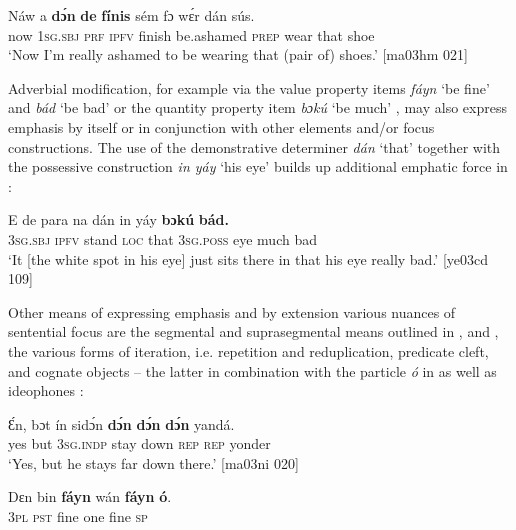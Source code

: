 \ea%
    \label{ex:key:743}
    \gll Náw    a    \textbf{dɔ́n}  \textbf{de}  \textbf{fínis}  sém  
fɔ  wɛ́r    dán    sús.\\
now    \textsc{1sg.sbj}  \textsc{prf}  \textsc{ipfv}  finish  be.ashamed
\textsc{prep}  wear  that    shoe\\

\glt ‘Now I’m really ashamed to be wearing that (pair of) shoes.’ [ma03hm 021]
\z

Adverbial modification, for example via the value property items \textit{fáyn} ‘be fine’ and \textit{bád} ‘be bad’ or the quantity property item \textit{bɔkú} ‘be much’ , may also express emphasis by itself or in conjunction with other elements and/or focus constructions. The use of the demonstrative determiner \textit{dán} ‘that’ together with the possessive construction \textit{in yáy} ‘his eye’ builds up additional emphatic force in :


\ea%
    \label{ex:key:744}
    \gll E    de  para    na  dán  in    yáy  \textbf{bɔkú}  \textbf{bád.}\\
\textsc{3sg.sbj}  \textsc{ipfv}  stand  \textsc{loc}  that  \textsc{3sg.poss}  eye  much  bad\\

\glt ‘It [the white spot in his eye] just sits there in that his eye really bad.’ [ye03cd 109]
\z

Other means of expressing emphasis and by extension various nuances of sentential focus are the segmental and suprasegmental means outlined in ,  and , the various forms of iteration, i.e. repetition  and reduplication, predicate cleft, and cognate objects – the latter in combination with the particle \textit{ó} in  as well as ideophones :


\ea%
    \label{ex:key:745}
    \gll Ɛ́n,  bɔt  ín    sidɔ́n  \textbf{dɔ́n}    \textbf{dɔ́n}     \textbf{dɔ́n}    yandá.\\
yes  but  \textsc{3sg.indp}  stay    down  \textsc{rep}    \textsc{rep}    yonder\\

\glt ‘Yes, but he stays far down there.’ [ma03ni 020]
\z


\ea%
    \label{ex:key:746}
    \gll Dɛn  bin  \textbf{fáyn}  wán    \textbf{fáyn}  \textbf{ó}.\\
\textsc{3pl}  \textsc{pst}  fine    one    fine    \textsc{sp}\\

